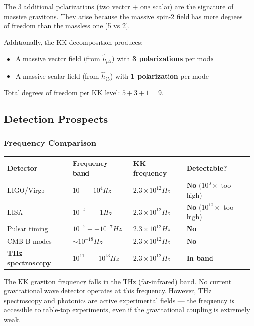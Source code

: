 \documentclass[aps,prd,preprint,superscriptaddress,longbibliography,floatfix]{revtex4-2}
\theoremstyle{remark}
\begin{document}
The 3 additional polarizations (two vector + one scalar) are the signature of massive gravitons. They arise because the massive spin-2 field has more degrees of freedom than the massless one (5 vs 2).

Additionally, the KK decomposition produces:

\begin{itemize}
  \item A massive vector field (from $\hat{h}_{\mu5}$) with \textbf{3 polarizations} per mode
  \item A massive scalar field (from $\hat{h}_{55}$) with \textbf{1 polarization} per mode
\end{itemize}

Total degrees of freedom per KK level: $5 + 3 + 1 = 9$.



\subsection{Detection Prospects}


\subsubsection{Frequency Comparison}


\begin{table}[H]
\begin{ruledtabular}
\begin{tabular}{p{3.8cm}p{3.8cm}p{3.8cm}p{3.8cm}}
Detector & Frequency band & KK frequency & Detectable? \\
\hline
LIGO/Virgo & $10 -- 10^{4} Hz$ & $2.3 \times 10^{12} Hz$ & \textbf{No} ($10^{8}\times$ too high) \\
LISA & $10^{-4} -- 1 Hz$ & $2.3 \times 10^{12} Hz$ & \textbf{No} ($10^{12}\times$ too high) \\
Pulsar timing & $10^{-9} -- 10^{-7} Hz$ & $2.3 \times 10^{12} Hz$ & \textbf{No} \\
CMB B-modes & $\sim 10^{-18} Hz$ & $2.3 \times 10^{12} Hz$ & \textbf{No} \\
\textbf{THz spectroscopy} & \textbf{$10^{11} -- 10^{13} Hz$} & \textbf{$2.3 \times 10^{12} Hz$} & \textbf{In band} \\
\end{tabular}
\end{ruledtabular}
\end{table}

The KK graviton frequency falls in the THz (far-infrared) band. No current gravitational wave detector operates at this frequency. However, THz spectroscopy and photonics are active experimental fields --- the frequency is accessible to table-top experiments, even if the gravitational coupling is extremely weak.
\end{document}

